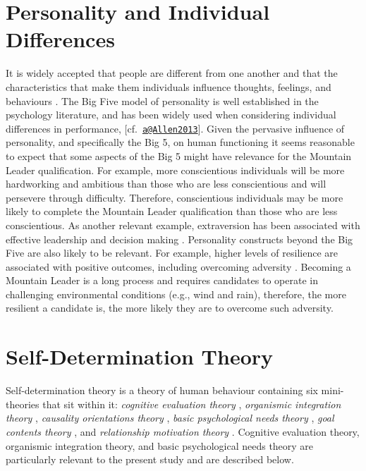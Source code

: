 \documentclass[
  12pt,
  a4paper,
]{book}
\begin{document}
\hypertarget{gen-intro-paid}{%
\section{Personality and Individual Differences}\label{gen-intro-paid}}

It is widely accepted that people are different from one another and that the characteristics that make them individuals influence thoughts, feelings, and behaviours \citep[cf.~][]{Roberts2015}. The Big Five model of personality \citep{McCrae1987} is well established in the psychology literature, and has been widely used when considering individual differences in performance, {[}cf.~\href{mailto:a@Allen2013}{\nolinkurl{a@Allen2013}}{]}. Given the pervasive influence of personality, and specifically the Big 5, on human functioning it seems reasonable to expect that some aspects of the Big 5 might have relevance for the Mountain Leader qualification. For example, more conscientious individuals will be more hardworking and ambitious than those who are less conscientious \citep{McCrae1987} and will persevere through difficulty. Therefore, conscientious individuals may be more likely to complete the Mountain Leader qualification than those who are less conscientious. As another relevant example, extraversion has been associated with effective leadership \citep{Judge2002} and decision making \citep{Hardy1996}. Personality constructs beyond the Big Five are also likely to be relevant. For example, higher levels of resilience are associated with positive outcomes, including overcoming adversity \citep{Smith2008}. Becoming a Mountain Leader is a long process and requires candidates to operate in challenging environmental conditions (e.g., wind and rain), therefore, the more resilient a candidate is, the more likely they are to overcome such adversity.

\hypertarget{gen-intro-sdt}{%
\section{Self-Determination Theory}\label{gen-intro-sdt}}

Self-determination theory \citep{Deci1985b, Deci2000, Ryan2017} is a theory of human behaviour containing six mini-theories that sit within it: \emph{cognitive evaluation theory} \citep{Deci1975, Deci1980}, \emph{organismic integration theory} \citep{Deci1985b, Ryan1989}, \emph{causality orientations theory} \citep{Deci1985a}, \emph{basic psychological needs theory} \citep{Ryan2000a}, \emph{goal contents theory} \citep{Kasser1996, Niemiec2009}, and \emph{relationship motivation theory} \citep{Deci2014, Ryan2017}. Cognitive evaluation theory, organismic integration theory, and basic psychological needs theory are particularly relevant to the present study and are described below.
\end{document}
